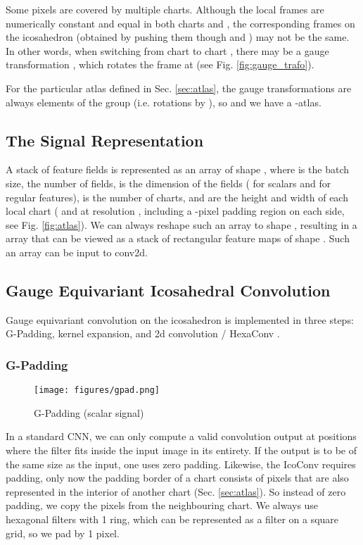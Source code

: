 \documentclass{article}
\begin{document}
Some pixels  are covered by multiple charts.
Although the local frames  are numerically constant and equal in both charts  and , the corresponding frames on the icosahedron (obtained by pushing them though  and ) may not be the same.
In other words, when switching from chart  to chart , there may be a gauge transformation , which rotates the frame at  (see Fig. \ref{fig:gauge_trafo}).

For the particular atlas defined in Sec. \ref{sec:atlas}, the gauge transformations  are always elements of the group  (i.e. rotations by ), so  and we have a -atlas.


\subsection{The Signal Representation}
\label{sec:signal_representation}

A stack of  feature fields is represented as an array of shape , where  is the batch size,  the number of fields,  is the dimension of the fields ( for scalars and  for regular features),  is the number of charts, and  are the height and width of each local chart ( and  at resolution , including a -pixel padding region on each side, see Fig. \ref{fig:atlas}).
We can always reshape such an array to shape , resulting in a  array that can be viewed as a stack of  rectangular feature maps of shape .
Such an array can be input to conv2d.


\subsection{Gauge Equivariant Icosahedral Convolution}

Gauge equivariant convolution on the icosahedron is implemented in three steps: G-Padding, kernel expansion, and 2d convolution / HexaConv \cite{hoogeboomHexaConv2018}.

\subsubsection{G-Padding}
\label{sec:gauge_padding}

\begin{wrapfigure}{r}{0.2\textwidth} 
\centering
    \texttt{[image: figures/gpad.png]}
    \caption{G-Padding (scalar signal)}
    \label{fig:gpad}
\end{wrapfigure}
In a standard CNN, we can only compute a valid convolution output at positions  where the filter fits inside the input image in its entirety.
If the output is to be of the same size as the input, one uses zero padding.
Likewise, the IcoConv requires padding, only now the padding border  of a chart consists of pixels that are also represented in the interior of another chart (Sec. \ref{sec:atlas}).
So instead of zero padding, we copy the pixels from the neighbouring chart.
We always use hexagonal filters with 1 ring, which can be represented as a  filter on a square grid, so we pad by 1 pixel.
\end{document}

